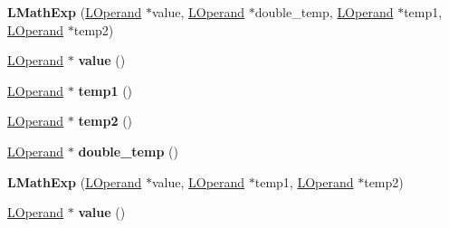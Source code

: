 \begin{DoxyCompactItemize}
\item 
{\bfseries L\+Math\+Exp} (\hyperlink{classv8_1_1internal_1_1_l_operand}{L\+Operand} $\ast$value, \hyperlink{classv8_1_1internal_1_1_l_operand}{L\+Operand} $\ast$double\+\_\+temp, \hyperlink{classv8_1_1internal_1_1_l_operand}{L\+Operand} $\ast$temp1, \hyperlink{classv8_1_1internal_1_1_l_operand}{L\+Operand} $\ast$temp2)\hypertarget{classv8_1_1internal_1_1_l_math_exp_a558e5fb429ca96f45fce9f078a8fa0f6}{}\label{classv8_1_1internal_1_1_l_math_exp_a558e5fb429ca96f45fce9f078a8fa0f6}

\item 
\hyperlink{classv8_1_1internal_1_1_l_operand}{L\+Operand} $\ast$ {\bfseries value} ()\hypertarget{classv8_1_1internal_1_1_l_math_exp_a59d6185f1b9e035a269046376b4432b8}{}\label{classv8_1_1internal_1_1_l_math_exp_a59d6185f1b9e035a269046376b4432b8}

\item 
\hyperlink{classv8_1_1internal_1_1_l_operand}{L\+Operand} $\ast$ {\bfseries temp1} ()\hypertarget{classv8_1_1internal_1_1_l_math_exp_a430c8c030cbaad33b264a77b03e0db75}{}\label{classv8_1_1internal_1_1_l_math_exp_a430c8c030cbaad33b264a77b03e0db75}

\item 
\hyperlink{classv8_1_1internal_1_1_l_operand}{L\+Operand} $\ast$ {\bfseries temp2} ()\hypertarget{classv8_1_1internal_1_1_l_math_exp_adb7bff0a3a668396d3393908dab289df}{}\label{classv8_1_1internal_1_1_l_math_exp_adb7bff0a3a668396d3393908dab289df}

\item 
\hyperlink{classv8_1_1internal_1_1_l_operand}{L\+Operand} $\ast$ {\bfseries double\+\_\+temp} ()\hypertarget{classv8_1_1internal_1_1_l_math_exp_a60d7d35b6ddd8f46774958dce30597dc}{}\label{classv8_1_1internal_1_1_l_math_exp_a60d7d35b6ddd8f46774958dce30597dc}

\item 
{\bfseries L\+Math\+Exp} (\hyperlink{classv8_1_1internal_1_1_l_operand}{L\+Operand} $\ast$value, \hyperlink{classv8_1_1internal_1_1_l_operand}{L\+Operand} $\ast$temp1, \hyperlink{classv8_1_1internal_1_1_l_operand}{L\+Operand} $\ast$temp2)\hypertarget{classv8_1_1internal_1_1_l_math_exp_a32a00730bc7d316fb3699ba289720b97}{}\label{classv8_1_1internal_1_1_l_math_exp_a32a00730bc7d316fb3699ba289720b97}

\item 
\hyperlink{classv8_1_1internal_1_1_l_operand}{L\+Operand} $\ast$ {\bfseries value} ()\hypertarget{classv8_1_1internal_1_1_l_math_exp_a59d6185f1b9e035a269046376b4432b8}{}\label{classv8_1_1internal_1_1_l_math_exp_a59d6185f1b9e035a269046376b4432b8}


\end{DoxyCompactItemize}
